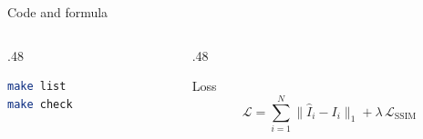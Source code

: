 \documentclass[aspectratio=169,10pt]{beamer}
\begin{document}
\begin{frame}[t,fragile]{Code and formula}
\begin{columns}[T,onlytextwidth]
  \begin{column}{.48\textwidth}
\begin{lstlisting}[language=bash]
make list
make check
\end{lstlisting}
  \end{column}
  \begin{column}{.48\textwidth}
    \begin{vspquoteblue}{Loss}
      \[
        \mathcal{L} = \sum_{i=1}^{N} \bigl\lVert \hat{I}_i - I_i \bigr\rVert_1
          + \lambda\,\mathcal{L}_{\mathrm{SSIM}}
      \]
    \end{vspquoteblue}
  \end{column}
\end{columns}
\end{frame}

\end{document}
